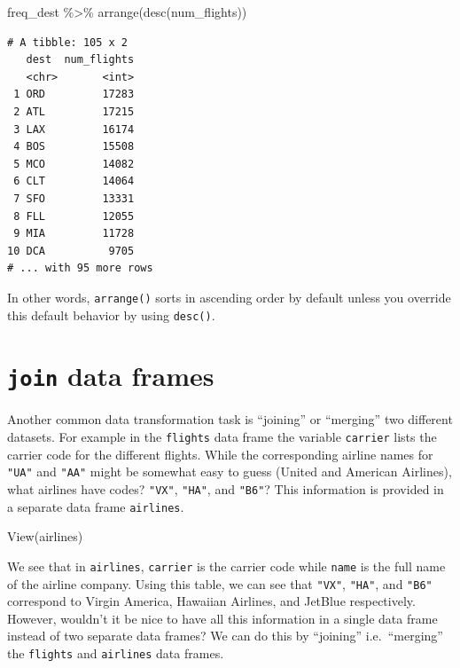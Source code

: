 \documentclass[
  letterpaper,
  DIV=11,
  numbers=noendperiod]{scrreprt}
\newenvironment{Shaded}{\begin{snugshade}}{\end{snugshade}}
\newcommand{\FunctionTok}[1]{\textcolor[rgb]{0.28,0.35,0.67}{#1}}
\newcommand{\NormalTok}[1]{\textcolor[rgb]{0.00,0.23,0.31}{#1}}
\newcommand{\SpecialCharTok}[1]{\textcolor[rgb]{0.37,0.37,0.37}{#1}}
\theoremstyle{definition}
\theoremstyle{remark}
\begin{document}
\begin{Shaded}
\begin{Highlighting}[]
\NormalTok{freq\_dest }\SpecialCharTok{\%\textgreater{}\%} 
  \FunctionTok{arrange}\NormalTok{(}\FunctionTok{desc}\NormalTok{(num\_flights))}
\end{Highlighting}
\end{Shaded}

\begin{verbatim}
# A tibble: 105 x 2
   dest  num_flights
   <chr>       <int>
 1 ORD         17283
 2 ATL         17215
 3 LAX         16174
 4 BOS         15508
 5 MCO         14082
 6 CLT         14064
 7 SFO         13331
 8 FLL         12055
 9 MIA         11728
10 DCA          9705
# ... with 95 more rows
\end{verbatim}

In other words, \texttt{arrange()} sorts in ascending order by default
unless you override this default behavior by using \texttt{desc()}.

\hypertarget{sec-joins}{%
\section{\texorpdfstring{\texttt{join} data
frames}{join data frames}}\label{sec-joins}}

Another common data transformation task is ``joining'' or ``merging''
two different datasets. For example in the \texttt{flights} data frame
the variable \texttt{carrier} lists the carrier code for the different
flights. While the corresponding airline names for \texttt{"UA"} and
\texttt{"AA"} might be somewhat easy to guess (United and American
Airlines), what airlines have codes? \texttt{"VX"}, \texttt{"HA"}, and
\texttt{"B6"}? This information is provided in a separate data frame
\texttt{airlines}.

\begin{Shaded}
\begin{Highlighting}[]
\FunctionTok{View}\NormalTok{(airlines)}
\end{Highlighting}
\end{Shaded}

We see that in \texttt{airlines}, \texttt{carrier} is the carrier code
while \texttt{name} is the full name of the airline company. Using this
table, we can see that \texttt{"VX"}, \texttt{"HA"}, and \texttt{"B6"}
correspond to Virgin America, Hawaiian Airlines, and JetBlue
respectively. However, wouldn't it be nice to have all this information
in a single data frame instead of two separate data frames? We can do
this by ``joining'' i.e.~``merging'' the \texttt{flights} and
\texttt{airlines} data frames.
\end{document}

